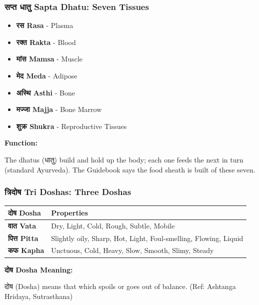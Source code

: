 \begin{frame}[fragile]\frametitle{सप्त धातु  Sapta Dhatu: Seven Tissues}
    \begin{itemize}
        \item \textbf{रस  Rasa} - Plasma
        \item \textbf{रक्त  Rakta} - Blood
        \item \textbf{मांस  Mamsa} - Muscle
        \item \textbf{मेद  Meda} - Adipose
        \item \textbf{अस्थि Asthi} - Bone
        \item \textbf{मज्जा Majja} - Bone Marrow
        \item \textbf{शुक्र Shukra} - Reproductive Tissues
    \end{itemize}
    \vspace{0.5cm}
    \textbf{Function:} 
    
    The dhatus (धातु) build and hold up the body; each one feeds the next in turn (standard Ayurveda). The Guidebook says the food sheath is built of these seven.
    
\end{frame}

\begin{frame}[fragile]\frametitle{त्रिदोष  Tri Doshas: Three Doshas}
    \begin{tabular}{|l|l|}
    \hline
    \textbf{दोष Dosha} & \textbf{Properties} \\
    \hline
    \textbf{वात  Vata} & Dry, Light, Cold, Rough, Subtle, Mobile \\
    \hline
    \textbf{पित्त Pitta} & Slightly oily, Sharp, Hot, Light, Foul-smelling, Flowing, Liquid \\
    \hline
    \textbf{कफ  Kapha} & Unctuous, Cold, Heavy, Slow, Smooth, Slimy, Steady \\
    \hline
    \end{tabular}
    \vspace{0.5cm}
    \textbf{दोष Dosha Meaning:}

    दोष (Dosha) means that which spoils or goes out of balance. {\tiny (Ref: Ashtanga Hridaya, Sutrasthana)}
    
\end{frame}

